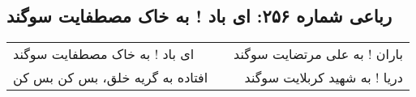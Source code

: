 \begin{center}
\section*{رباعی شماره ۲۵۶: ای باد ! به خاک مصطفایت سوگند}
\label{sec:sh256}
\begin{longtable}{l p{0.5cm} r}
ای باد ! به خاک مصطفایت سوگند
&&
باران ! به علی مرتضایت سوگند
\\
افتاده به گریه خلق، بس کن بس کن
&&
دریا ! به شهید کربلایت سوگند
\\
\end{longtable}
\end{center}
